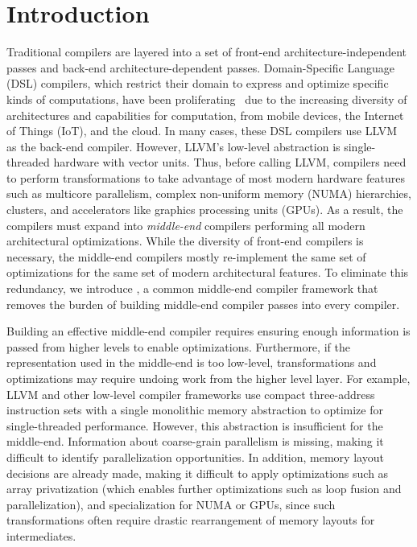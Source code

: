 
\section{Introduction}
\label{sec:intro}

Traditional compilers are layered into a set of front-end architecture-independent passes and back-end architecture-dependent passes. Domain-Specific Language (DSL) compilers, which restrict their domain to express and optimize specific kinds of computations, have been proliferating~\cite{halide_12,DBLP:conf/pldi/Ragan-KelleyBAPDA13,diedrot_pldi12,DBLP:journals/toms/AlnaesLORW14,polymage,bezanson2017julia,tensorflow} due to the increasing diversity of architectures and capabilities for computation, from mobile devices, the Internet of Things (IoT), and the cloud.
In many cases, these DSL compilers use LLVM~\cite{llvm} as the back-end compiler. However, LLVM's low-level abstraction is single-threaded hardware with vector units. Thus, before calling LLVM, compilers need to perform transformations to take advantage of most modern hardware features such as multicore parallelism, complex non-uniform memory (NUMA) hierarchies, clusters, and accelerators like graphics processing units (GPUs). As a result, the compilers must expand into {\it middle-end} compilers performing all modern architectural optimizations.  While the diversity of front-end compilers is necessary, the middle-end compilers mostly re-implement the same set of optimizations for the same set of modern architectural features. To eliminate this redundancy, we introduce \framework, a common middle-end compiler framework that removes the burden of building middle-end compiler passes into every compiler.

Building an effective middle-end compiler requires ensuring enough information is passed from higher levels
to enable optimizations.  Furthermore, if the representation used in the middle-end is too low-level,
transformations and optimizations may require undoing work from the higher level layer.  For example,
LLVM and other low-level compiler frameworks use compact three-address instruction sets with a single monolithic memory abstraction to optimize for single-threaded performance.  However, this abstraction is insufficient for the middle-end.
Information about coarse-grain parallelism is missing, making it difficult to identify parallelization
opportunities.  In addition, memory layout decisions are already made, making it difficult to apply optimizations such as array privatization (which enables further optimizations such as loop fusion and
parallelization), and specialization for NUMA or GPUs, since such transformations often require drastic rearrangement
of memory layouts for intermediates.

